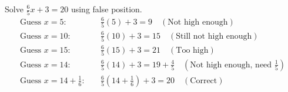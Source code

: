 \documentclass[12pt]{exam}
\begin{document}
\begin{questions}
\newpage 
\question 
Solve $\frac{6}{5}x + 3 = 20$ using false position. 
\begin{align*}
  \text{Guess } x=5: &\quad \frac{6}{5}(5) + 3 = 9 \quad (\text{Not high enough})\\
  \text{Guess } x=10: &\quad \frac{6}{5}(10) + 3 = 15 \quad (\text{Still not high enough})\\
  \text{Guess } x=15: &\quad \frac{6}{5}(15) + 3 = 21 \quad (\text{Too high})\\
  \text{Guess } x=14: &\quad \frac{6}{5}(14) + 3 = 19 + \frac{4}{5} \quad \left(\text{Not high enough, need } \frac{1}{5}\right)\\
  \text{Guess } x=14 + \frac{1}{6}: &\quad \frac{6}{5}\left(14 + \frac{1}{6}\right) + 3 = 20 \quad (\text{Correct})\\
\end{align*}

\end{questions}
\end{document}
